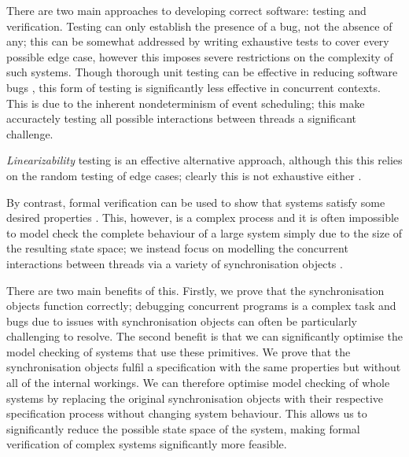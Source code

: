 There are two main approaches to developing correct software: testing and verification. 
Testing can only establish the presence of a bug, not the absence of any; this can be somewhat addressed by writing exhaustive tests to cover every possible edge case, however this imposes severe restrictions on the complexity of such systems. Though thorough unit testing can be effective in reducing software bugs \cite{MicroTest}, this form of testing is significantly less effective in concurrent contexts. This is due to the inherent nondeterminism of event scheduling; this make accuractely testing all possible interactions between threads a significant challenge.

\emph{Linearizability} testing is an effective alternative approach, although this this relies on the random testing of edge cases; clearly this is not exhaustive either \cite{LoweLin}.

By contrast, formal verification can be used to show that systems satisfy some desired properties \cite{PrinciplesOfModelChecking}. This, however, is a complex process and it is often impossible to model check the complete behaviour of a large system simply due to the size of the resulting state space; we instead focus on modelling the concurrent interactions between threads via a variety of synchronisation objects . 

There are two main benefits of this. Firstly, we prove that the synchronisation objects function correctly; debugging concurrent programs is a complex task and bugs due to issues with synchronisation objects can often be particularly challenging to resolve. The second benefit is that we can significantly optimise the model checking of systems that use these primitives. We prove that the synchronisation objects fulfil a specification with the same properties but without all of the internal workings. We can therefore optimise model checking of whole systems by replacing the original synchronisation objects with their respective specification process without changing system behaviour. This allows us to significantly reduce the possible state space of the system, making formal verification of complex systems significantly more feasible.


